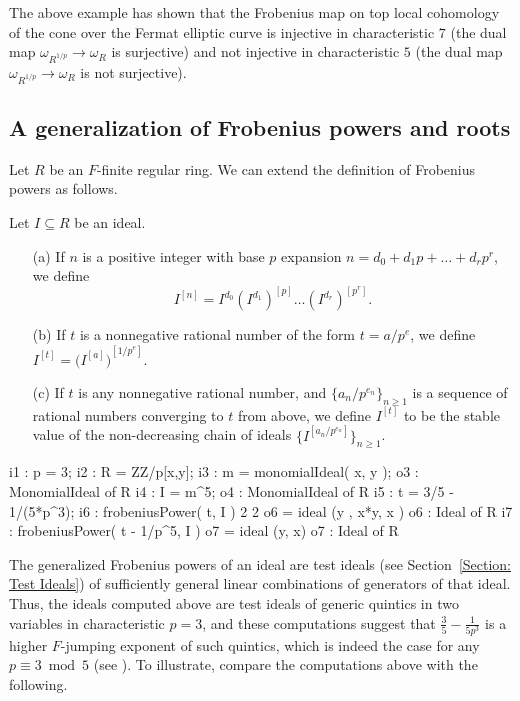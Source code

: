 \documentclass{amsart}
\renewcommand{\geq}{\geqslant}
\begin{document}
The above example has shown that the Frobenius map on top local cohomology of the cone over the Fermat elliptic curve is injective in characteristic $7$ (the dual map $\omega_{R^{1/p}} \to \omega_R$ is surjective) and not injective in characteristic $5$ (the dual map $\omega_{R^{1/p}} \to \omega_R$ is not surjective).

\subsection{A generalization of Frobenius powers and roots}

Let $R$ be an $F$-finite regular ring.
We can extend the definition of Frobenius powers as follows.

\begin{definition}
Let  $I\subseteq R$ be an ideal.
\begin{enumerate}
 \item[(a)] If $n$ is a positive integer with base $p$ expansion  $n=d_0 + d_1 p +  \dots + d_r p^r$, we define
\[ I^{[n]}=I^{d_0} (I^{d_1})^{[p]} \dots  (I^{d_r})^{[p^r]}.\]
 \item[(b)] If $t$ is a nonnegative rational number of the form $t = a/p^e$, we define  $I^{[t]} = {\big(I^{[a]}\big)}^{[1/p^e]}.$
 \item[(c)] If $t$ is any nonnegative rational number, and $\{a_n/p^{e_n}\}_{n\geq 1}$ is a sequence of rational numbers converging to $t$ from above, we define $I^{[t]}$
 to be the stable value of the non-decreasing chain of ideals $\{I^{[a_n/p^{e_n}]}\}_{n\geq 1}$.
\end{enumerate}
\end{definition}

\medskip
{\small
\begin{MyVerbatim}
i1 : p = 3;
i2 : R = ZZ/p[x,y];
i3 : m = monomialIdeal( x, y );
o3 : MonomialIdeal of R
i4 : I = m^5;
o4 : MonomialIdeal of R
i5 : t = 3/5 - 1/(5*p^3);
i6 : frobeniusPower( t, I )
             2        2
o6 = ideal (y , x*y, x )
o6 : Ideal of R
i7 : frobeniusPower( t - 1/p^5, I )
o7 = ideal (y, x)
o7 : Ideal of R
\end{MyVerbatim}
}
\medskip

The generalized Frobenius powers of an ideal are test ideals (see Section~\ref{Section: Test Ideals}) of sufficiently general linear combinations of generators of that ideal.
Thus, the ideals computed above are test ideals of generic quintics in two variables in characteristic $p=3$, and these computations suggest that $\frac35-\frac1{5p^3}$ is a higher $F$-jumping exponent of such quintics, which is indeed the case for any $p\equiv 3 \bmod 5$ (see \cite{hernandez+etal.frobenius_examples}).
To illustrate, compare the computations above with the following.
\end{document}
